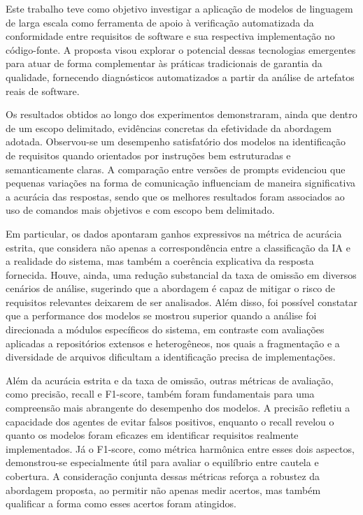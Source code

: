 
Este trabalho teve como objetivo investigar a aplicação de modelos de linguagem de larga escala como ferramenta de apoio à verificação automatizada da conformidade entre requisitos de software e sua respectiva implementação no código-fonte. A proposta visou explorar o potencial dessas tecnologias emergentes para atuar de forma complementar às práticas tradicionais de garantia da qualidade, fornecendo diagnósticos automatizados a partir da análise de artefatos reais de software.

Os resultados obtidos ao longo dos experimentos demonstraram, ainda que dentro de um escopo delimitado, evidências concretas da efetividade da abordagem adotada. Observou-se um desempenho satisfatório dos modelos na identificação de requisitos quando orientados por instruções bem estruturadas e semanticamente claras. A comparação entre versões de prompts evidenciou que pequenas variações na forma de comunicação influenciam de maneira significativa a acurácia das respostas, sendo que os melhores resultados foram associados ao uso de comandos mais objetivos e com escopo bem delimitado.

Em particular, os dados apontaram ganhos expressivos na métrica de acurácia estrita, que considera não apenas a correspondência entre a classificação da IA e a realidade do sistema, mas também a coerência explicativa da resposta fornecida. Houve, ainda, uma redução substancial da taxa de omissão em diversos cenários de análise, sugerindo que a abordagem é capaz de mitigar o risco de requisitos relevantes deixarem de ser analisados. Além disso, foi possível constatar que a performance dos modelos se mostrou superior quando a análise foi direcionada a módulos específicos do sistema, em contraste com avaliações aplicadas a repositórios extensos e heterogêneos, nos quais a fragmentação e a diversidade de arquivos dificultam a identificação precisa de implementações.

Além da acurácia estrita e da taxa de omissão, outras métricas de avaliação, como precisão, recall e F1-score, também foram fundamentais para uma compreensão mais abrangente do desempenho dos modelos. A precisão refletiu a capacidade dos agentes de evitar falsos positivos, enquanto o recall revelou o quanto os modelos foram eficazes em identificar requisitos realmente implementados. Já o F1-score, como métrica harmônica entre esses dois aspectos, demonstrou-se especialmente útil para avaliar o equilíbrio entre cautela e cobertura. A consideração conjunta dessas métricas reforça a robustez da abordagem proposta, ao permitir não apenas medir acertos, mas também qualificar a forma como esses acertos foram atingidos.


